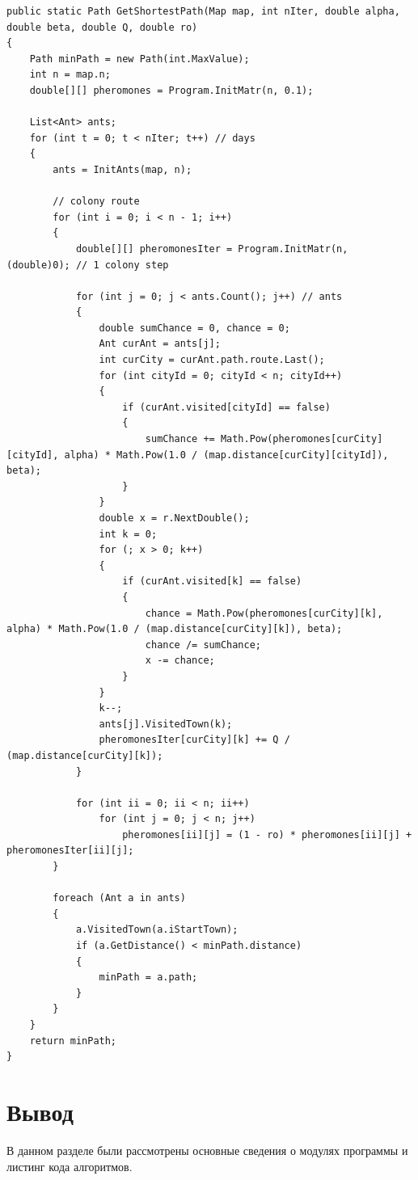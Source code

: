 \documentclass[12pt]{report}
\begin{document}
\begin{lstlisting}[label=some-code,caption=Муравьиный алгоритм]
public static Path GetShortestPath(Map map, int nIter, double alpha, double beta, double Q, double ro)
{
    Path minPath = new Path(int.MaxValue);
    int n = map.n;
    double[][] pheromones = Program.InitMatr(n, 0.1);

    List<Ant> ants;
    for (int t = 0; t < nIter; t++) // days
    {
        ants = InitAnts(map, n);

        // colony route
        for (int i = 0; i < n - 1; i++)
        {
            double[][] pheromonesIter = Program.InitMatr(n, (double)0); // 1 colony step

            for (int j = 0; j < ants.Count(); j++) // ants
            {
                double sumChance = 0, chance = 0;
                Ant curAnt = ants[j];
                int curCity = curAnt.path.route.Last();
                for (int cityId = 0; cityId < n; cityId++) 
                {
                    if (curAnt.visited[cityId] == false)
                    {
                        sumChance += Math.Pow(pheromones[curCity][cityId], alpha) * Math.Pow(1.0 / (map.distance[curCity][cityId]), beta);
                    }
                }
                double x = r.NextDouble();
                int k = 0;
                for (; x > 0; k++)
                {
                    if (curAnt.visited[k] == false)
                    {
                        chance = Math.Pow(pheromones[curCity][k], alpha) * Math.Pow(1.0 / (map.distance[curCity][k]), beta);
                        chance /= sumChance;
                        x -= chance;
                    }
                }
                k--;
                ants[j].VisitedTown(k);
                pheromonesIter[curCity][k] += Q / (map.distance[curCity][k]);
            }

            for (int ii = 0; ii < n; ii++)
                for (int j = 0; j < n; j++)
                    pheromones[ii][j] = (1 - ro) * pheromones[ii][j] + pheromonesIter[ii][j];
        }
        
        foreach (Ant a in ants)
        {
            a.VisitedTown(a.iStartTown);
            if (a.GetDistance() < minPath.distance)
            {
                minPath = a.path;
            }
        }                
    }
    return minPath;
}
\end{lstlisting}

\captionsetup{singlelinecheck = false, justification=centering}

\section*{Вывод}
В данном разделе были рассмотрены основные сведения о модулях программы и листинг кода алгоритмов.
\end{document}

